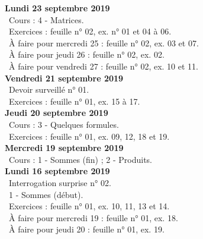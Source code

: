 \documentclass[12pt,a4paper]{article}
\begin{document}
% 
% 
% 
 \noindent\textbf{\bf Lundi 23 septembre 2019}\\
 \bu\ Cours : 4 - Matrices.\\
 \bu\ Exercices : feuille n° 02, ex. n° 01 et 04 à 06.\\
 \bu\ À faire pour mercredi 25 : feuille n° 02, ex. 03 et 07.\\
 \bu\ À faire pour jeudi 26 : feuille n° 02, ex. 02.\\
 \bu\ À faire pour vendredi 27 : feuille n° 02, ex. 10 et 11.\vspace{.4cm}\\ 
 
 \noindent\textbf{Vendredi 21 septembre 2019}\\
 \bu\ Devoir surveillé n° 01.\\
 \bu\ Exercices : feuille n° 01, ex. 15 à 17.\vspace{.4cm}\\
  
 \noindent\textbf{Jeudi 20 septembre 2019}\\
 \bu\ Cours : 3 - Quelques formules.\\
 \bu\ Exercices : feuille n° 01, ex. 09, 12, 18 et 19.\vspace{.4cm}\\
 
 \noindent\textbf{\bf Mercredi 19 septembre 2019}\\
 \bu\ Cours : 1 - Sommes (fin) ; 2 - Produits.\vspace{.4cm}\\
 
 \noindent\textbf{\bf Lundi 16 septembre 2019}\\ 
 \bu\ Interrogation surprise n° 02.\\
 \bu\ 1 - Sommes (début).\\
 \bu\ Exercices : feuille n° 01, ex. 10, 11, 13 et 14.\\
 \bu\ À faire pour mercredi 19 : feuille n° 01, ex. 18.\\
 \bu\ À faire pour jeudi 20 : feuille n° 01, ex. 19.\vspace{.4cm}\\
 
\end{document}
